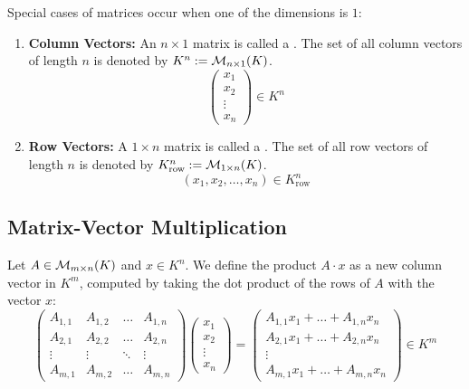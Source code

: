 \begin{definition}
Special cases of matrices occur when one of the dimensions is $1$:
\begin{enumerate}
    \item \textbf{Column Vectors:} An $n \times 1$ matrix is called a . The set of all column vectors of length $n$ is denoted by $K^n := \mathcal{M}_{n \times 1}(K)$.
    \[
    \begin{pmatrix} x_1 \\ x_2 \\ \vdots \\ x_n \end{pmatrix} \in K^n
    \]
    \item \textbf{Row Vectors:} A $1 \times n$ matrix is called a . The set of all row vectors of length $n$ is denoted by $K_{\text{row}}^n := \mathcal{M}_{1 \times n}(K)$.
    \[
    (x_1, x_2, \dots, x_n) \in K_{\text{row}}^n
    \]
\end{enumerate}
\end{definition}

\subsection{Matrix-Vector Multiplication}

\begin{definition}
Let $A \in \mathcal{M}_{m \times n}(K)$ and $x \in K^n$. We define the product $A \cdot x$ as a new column vector in $K^m$, computed by taking the dot product of the rows of $A$ with the vector $x$:
\[
\begin{pmatrix} 
A_{1,1} & A_{1,2} & \dots & A_{1,n} \\
A_{2,1} & A_{2,2} & \dots & A_{2,n} \\
\vdots & \vdots & \ddots & \vdots \\
A_{m,1} & A_{m,2} & \dots & A_{m,n} 
\end{pmatrix}
\begin{pmatrix} x_1 \\ x_2 \\ \vdots \\ x_n \end{pmatrix}
=
\begin{pmatrix} 
A_{1,1}x_1 + \dots + A_{1,n}x_n \\
A_{2,1}x_1 + \dots + A_{2,n}x_n \\
\vdots \\
A_{m,1}x_1 + \dots + A_{m,n}x_n 
\end{pmatrix} \in K^m
\]
\end{definition}

